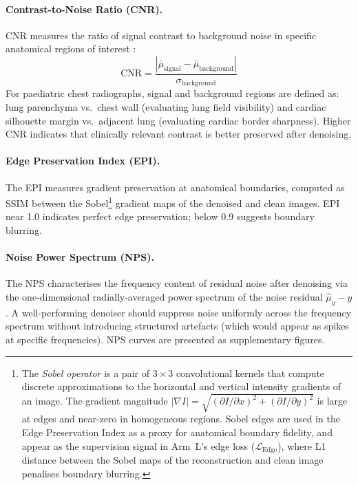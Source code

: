 \documentclass[12pt, a4paper, twoside, openright]{book}
\begin{document}
\paragraph{Contrast-to-Noise Ratio (CNR).}
CNR measures the ratio of signal contrast to background noise in specific anatomical
regions of interest \cite{rose_sensitivity_1948}:
\begin{equation}
\label{eq:methods:cnr}
\mathrm{CNR} = \frac{\left|\bar{\mu}_{\mathrm{signal}} - \bar{\mu}_{\mathrm{background}}\right|}{\sigma_{\mathrm{background}}}
\end{equation}
For paediatric chest radiographs, signal and background regions are defined as: lung
parenchyma vs.\ chest wall (evaluating lung field visibility) and cardiac silhouette margin
vs.\ adjacent lung (evaluating cardiac border sharpness). Higher CNR indicates that
clinically relevant contrast is better preserved after denoising.

\paragraph{Edge Preservation Index (EPI).}
The EPI measures gradient preservation at anatomical boundaries, computed as SSIM between the Sobel\footnote{The \emph{Sobel operator} \cite{sobel_presentation_1968} is a pair of $3\times3$ convolutional kernels that compute discrete approximations to the horizontal and vertical intensity gradients of an image. The gradient magnitude $|\nabla I| = \sqrt{(\partial I/\partial x)^2 + (\partial I/\partial y)^2}$ is large at edges and near-zero in homogeneous regions. Sobel edges are used in the Edge Preservation Index as a proxy for anatomical boundary fidelity, and appear as the supervision signal in Arm~L's edge loss ($\mathcal{L}_{\mathrm{Edge}}$), where L1 distance between the Sobel maps of the reconstruction and clean image penalises boundary blurring.} gradient maps of the denoised and clean images. EPI near 1.0 indicates perfect edge preservation; below 0.9 suggests boundary blurring.

\paragraph{Noise Power Spectrum (NPS).}
The NPS characterises the frequency content of residual noise after denoising via the
one-dimensional radially-averaged power spectrum of the noise residual
$\hat{\mu}_y - y$ \cite{makitalo_optimal_2013}. A well-performing denoiser should suppress
noise uniformly across the frequency spectrum without introducing structured artefacts
(which would appear as spikes at specific frequencies). NPS curves are presented as
supplementary figures.
\end{document}
